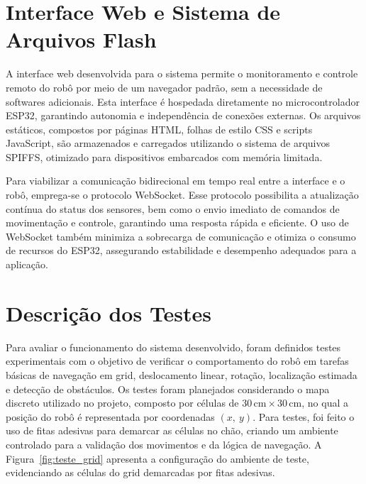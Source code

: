 \documentclass[	12pt, Times, openright, twoside, a4paper, english, brazil]{abntex2}
\begin{document}


\section{Interface Web e Sistema de Arquivos Flash}

A interface web desenvolvida para o sistema permite o monitoramento e controle remoto do robô por meio de um navegador padrão, sem a necessidade de softwares adicionais. Esta interface é hospedada diretamente no microcontrolador ESP32, garantindo autonomia e independência de conexões externas. Os arquivos estáticos, compostos por páginas HTML, folhas de estilo CSS e scripts JavaScript, são armazenados e carregados utilizando o sistema de arquivos SPIFFS, otimizado para dispositivos embarcados com memória limitada.

Para viabilizar a comunicação bidirecional em tempo real entre a interface e o robô, emprega-se o protocolo WebSocket. Esse protocolo possibilita a atualização contínua do status dos sensores, bem como o envio imediato de comandos de movimentação e controle, garantindo uma resposta rápida e eficiente. O uso de WebSocket também minimiza a sobrecarga de comunicação e otimiza o consumo de recursos do ESP32, assegurando estabilidade e desempenho adequados para a aplicação.


\section{Descrição dos Testes} \label{sec:descricao_testes}

Para avaliar o funcionamento do sistema desenvolvido, foram definidos testes experimentais com o objetivo de verificar o comportamento do robô em tarefas básicas de navegação em grid, deslocamento linear, rotação, localização estimada e detecção de obstáculos. Os testes foram planejados considerando o mapa discreto utilizado no projeto, composto por células de $30\,\text{cm} \times 30\,\text{cm}$, no qual a posição do robô é representada por coordenadas $(x,\ y)$. Para testes, foi feito o uso de fitas adesivas para demarcar as células no chão, criando um ambiente controlado para a validação dos movimentos e da lógica de navegação. A Figura~\ref{fig:teste_grid} apresenta a configuração do ambiente de teste, evidenciando as células do grid demarcadas por fitas adesivas.
\end{document}
